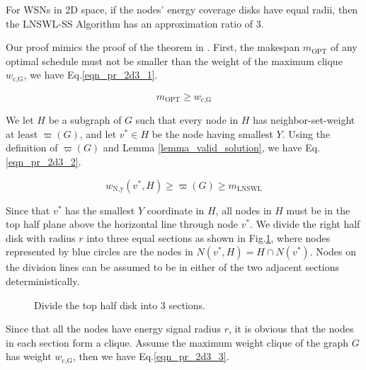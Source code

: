 \documentclass[journal,10pt]{IEEEtran}
\begin{document}
\begin{lemma}
\label{lemma_2d_ratio3}
For WSNs in 2D space, if the nodes' energy coverage disks have equal radii, then the LNSWL-SS Algorithm has an approximation ratio of 3.
\end{lemma}

\begin{IEEEproof}
Our proof mimics the proof of the theorem in \cite{Marathe1995}. First, the makespan $m_\text{OPT}$ of any optimal schedule must not be smaller than the weight of the maximum clique $w_\text{c,G}$, we have Eq.\eqref{eqn_pr_2d3_1}.

\begin{equation}
\label{eqn_pr_2d3_1}
m_\text{OPT}{\geq}w_\text{c,G}
\end{equation}

We let $H$ be a subgraph of $G$ such that every node in $H$ has neighbor-set-weight at least $\varpi(G)$, and let $v^{*}{\in}H$ be the node having smallest $Y$. Using the definition of $\varpi(G)$ and Lemma \ref{lemma_valid_solution}, we have Eq.\eqref{eqn_pr_2d3_2}.

\begin{equation}
\label{eqn_pr_2d3_2}
w_\text{N,y}(v^{*},H){\geq}\varpi(G){\geq}m_\text{LNSWL}
\end{equation}

Since that $v^{*}$ has the smallest $Y$ coordinate in $H$, all nodes in $H$ must be in the top half plane above the horizontal line through node $v^{*}$. We divide the right half disk with radius $r$ into three equal sections as shown in Fig.\ref{fig_2d3part}, where nodes represented by blue circles are the nodes in $N(v^{*},H){=}H{\cap}N(v^{*})$. Nodes on the division lines can be assumed to be in either of the two adjacent sections deterministically.

\begin{figure}[htb]
\caption{Divide the top half disk into 3 sections.}
\label{fig_2d3part}
\end{figure}

Since that all the nodes have energy signal radius $r$, it is obvious that the nodes in each section form a clique. Assume the maximum weight clique of the graph $G$ has weight $w_\text{c,G}$, then we have Eq.\eqref{eqn_pr_2d3_3}.


\end{IEEEproof}
\end{document}

